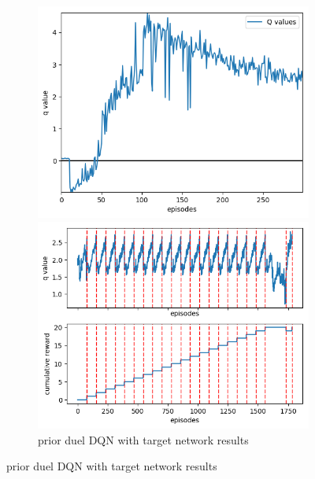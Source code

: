 \documentclass[10pt]{article}
\begin{document}
\begin{figure}
\begin{subfigure}{0.49\textwidth}
\begin{minipage}{\linewidth}
			\includegraphics[width=\linewidth]{prior_duel_DDQN_qval.png}
		\end{minipage}\vfill
		\begin{minipage}{\linewidth}
			\includegraphics[width=\linewidth]{prior_duel_DDQN_game.png}
		\end{minipage}	\vfill
		\caption{prior duel DQN with target network results}
	\end{subfigure}
	\setcounter{figure}{2}    
\end{figure}
\FloatBarrier
\end{document}
